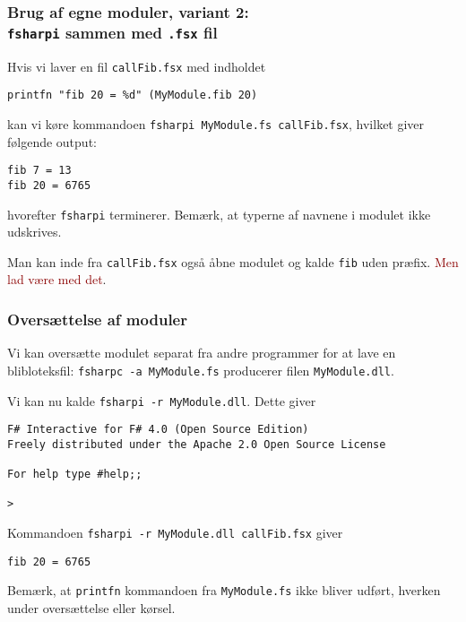 \documentclass{beamer}
\begin{document}
\begin{frame}[fragile=singleslide]
\frametitle{Brug af egne moduler, variant 2:\\ \texttt{fsharpi} sammen
  med \texttt{.fsx} fil}

Hvis vi laver en fil \texttt{callFib.fsx} med indholdet

\renewcommand{\baselinestretch}{0.82}
{\small
\begin{verbatim}
printfn "fib 20 = %d" (MyModule.fib 20)
\end{verbatim}
}
\renewcommand{\baselinestretch}{1.0}

kan vi køre kommandoen \texttt{fsharpi MyModule.fs callFib.fsx},
hvilket giver følgende output:


\renewcommand{\baselinestretch}{0.82}
{\small
\begin{verbatim}
fib 7 = 13
fib 20 = 6765
\end{verbatim}
}
\renewcommand{\baselinestretch}{1.0}

hvorefter \texttt{fsharpi} terminerer.  Bemærk, at typerne af navnene
i modulet ikke udskrives.

Man kan inde fra \texttt{callFib.fsx} også åbne modulet og kalde
\texttt{fib} uden præfix.  \textcolor{darkred}{Men lad være med det}.

\end{frame}

\begin{frame}[fragile=singleslide]
\frametitle{Oversættelse af moduler}

Vi kan oversætte modulet separat fra andre programmer for at lave en
blibloteksfil: \texttt{fsharpc -a MyModule.fs} producerer filen
\texttt{MyModule.dll}.

\vspace{1ex}
Vi kan nu kalde \texttt{fsharpi -r MyModule.dll}.  Dette giver

\renewcommand{\baselinestretch}{0.82}
{\small
\begin{verbatim}
F# Interactive for F# 4.0 (Open Source Edition)
Freely distributed under the Apache 2.0 Open Source License

For help type #help;;

>
\end{verbatim}
}
\renewcommand{\baselinestretch}{1.0}

Kommandoen \texttt{fsharpi -r MyModule.dll callFib.fsx} giver


\renewcommand{\baselinestretch}{0.82}
{\small
\begin{verbatim}
fib 20 = 6765
\end{verbatim}
}
\renewcommand{\baselinestretch}{1.0}


Bemærk, at \texttt{printfn} kommandoen fra \texttt{MyModule.fs} ikke
bliver udført, hverken under oversættelse eller kørsel.

\end{frame}
\end{document}
